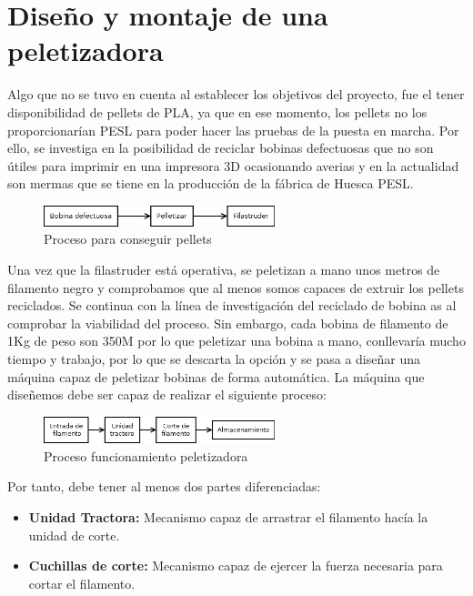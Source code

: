 
\chapter{Diseño y montaje de una peletizadora}
\label{ane:peletizadora}

Algo que no se tuvo en cuenta al establecer los objetivos del proyecto, fue el tener disponibilidad de pellets de PLA, ya que en ese momento, los pellets no los proporcionarían PESL para poder hacer las pruebas de la puesta en marcha. Por ello, se investiga en la posibilidad de reciclar bobinas defectuosas que no son útiles para imprimir en una impresora 3D ocasionando averias y en la actualidad son mermas que se tiene en la producción de la fábrica de Huesca PESL.

\begin{figure}[H]
    \centering
    \includegraphics[width=0.6\textwidth]{images/peletizadora/Diagram.png}
    \caption{Proceso para conseguir pellets}
    \label{fig:peletizadora_diagram}
\end{figure}

Una vez que la filastruder está operativa, se peletizan a mano unos metros de filamento negro y comprobamos que al menos somos capaces de extruir los pellets reciclados. Se continua con la línea de investigación del reciclado de bobina as al comprobar la viabilidad del proceso. Sin embargo, cada bobina de filamento de 1Kg de peso son 350M por lo que peletizar una bobina a mano, conllevaría mucho tiempo y trabajo, por lo que se descarta la opción y se pasa a diseñar una máquina capaz de peletizar bobinas de forma automática. La máquina que diseñemos debe ser capaz de realizar el siguiente proceso:

\begin{figure}[H]
    \centering
    \includegraphics[width=0.6\textwidth]{images/peletizadora/Diagram2.png}
    \caption{Proceso funcionamiento peletizadora}
    \label{fig:peletizadora_diagram2}
\end{figure}

Por tanto, debe tener al menos dos partes diferenciadas:

\begin{itemize}
	\item{\textbf{Unidad Tractora:} Mecanismo capaz de arrastrar el filamento hacía la unidad de corte.}
	\item{\textbf{Cuchillas de corte:} Mecanismo capaz de ejercer la fuerza necesaria para cortar el filamento.}
\end{itemize}

